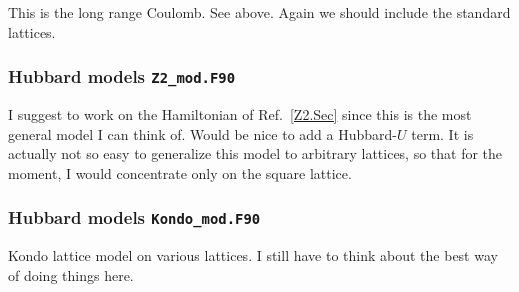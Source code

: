This is the long range Coulomb. See above.    Again we should include the   standard lattices. 

\subsubsection{Hubbard models   \texttt{Z2\_mod.F90}}
I suggest to work on the  Hamiltonian of Ref.~\ref{Z2.Sec} since this is the most general  model I can think of.   Would be nice to add a Hubbard-$U$ term.  It is actually not so easy to generalize this model to 
arbitrary lattices, so that for the moment, I would concentrate only on the square lattice. 

\subsubsection{Hubbard models   \texttt{Kondo\_mod.F90}}
Kondo lattice model on various lattices.  I still have to think about the best way of doing things here. 
